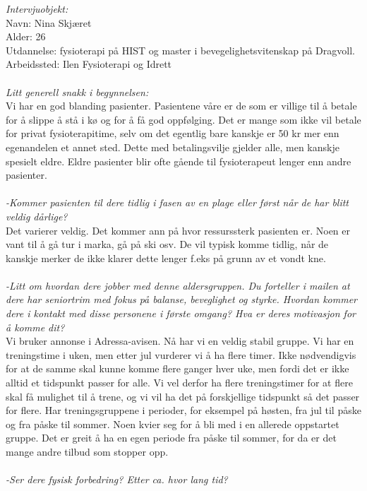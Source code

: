 \emph{Intervjuobjekt:}\\
Navn: Nina Skjæret\\
Alder: 26 \\
Utdannelse: fysioterapi på HIST og master i bevegelighetsvitenskap på Dragvoll. \\
Arbeidssted: Ilen Fysioterapi og Idrett\\ \\
\emph{Litt generell snakk i begynnelsen:}\\
Vi har en god blanding pasienter. Pasientene våre er de som er villige til å betale for å slippe å stå i kø og for å få god oppfølging. Det er mange som ikke vil betale for privat fysioterapitime, selv om det egentlig bare kanskje er 50 kr mer enn egenandelen et annet sted. Dette med betalingsvilje gjelder alle, men kanskje spesielt eldre. Eldre pasienter blir ofte gående til fysioterapeut lenger enn andre pasienter. \\ \\ 
\emph{-Kommer pasienten til dere tidlig i fasen av en plage eller først når de har blitt veldig dårlige?}\\
Det varierer veldig. Det kommer ann på hvor ressurssterk pasienten er. Noen er vant til å gå tur i marka, gå på ski osv. De vil typisk komme tidlig, når de kanskje merker de ikke klarer dette lenger f.eks på grunn av et vondt kne. \\ \\
\emph{-Litt om hvordan dere jobber med denne aldersgruppen. Du forteller i mailen at dere har seniortrim med fokus på balanse, beveglighet og styrke. Hvordan kommer dere i kontakt med disse personene i første omgang? Hva er deres motivasjon for å komme dit?}\\
Vi bruker annonse i Adressa-avisen. Nå har vi en veldig stabil gruppe. Vi har en treningstime i uken, men etter jul vurderer vi å ha flere timer. Ikke nødvendigvis for at de samme skal kunne komme flere ganger hver uke, men fordi det er ikke alltid et tidspunkt passer for alle. Vi vel derfor ha flere treningstimer for at flere skal få mulighet til å trene, og vi vil ha det på forskjellige tidspunkt så det passer for flere. Har treningsgruppene i perioder, for eksempel på høsten, fra jul til påske og fra påske til sommer. Noen kvier seg for å bli med i en allerede oppstartet gruppe. Det er greit å ha en egen periode fra påske til sommer, for da er det mange andre tilbud som stopper opp. \\ \\
\emph{-Ser dere fysisk forbedring? Etter ca. hvor lang tid?}\\
